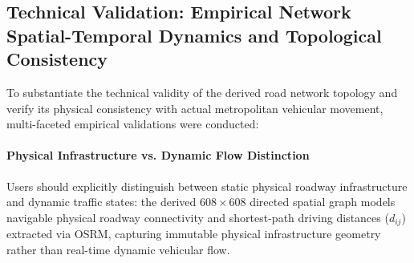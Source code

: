\documentclass[preprint,12pt]{elsarticle}
\begin{document}
\subsection{Technical Validation: Empirical Network Spatial-Temporal Dynamics and Topological Consistency}
\label{sec:technical_validation}
To substantiate the technical validity of the derived road network topology and verify its physical consistency with actual metropolitan vehicular movement, multi-faceted empirical validations were conducted:

\paragraph{Physical Infrastructure vs. Dynamic Flow Distinction}
Users should explicitly distinguish between static physical roadway infrastructure and dynamic traffic states: the derived $608 \times 608$ directed spatial graph models navigable physical roadway connectivity and shortest-path driving distances ($d_{ij}$) extracted via OSRM, capturing immutable physical infrastructure geometry rather than real-time dynamic vehicular flow.
\end{document}
